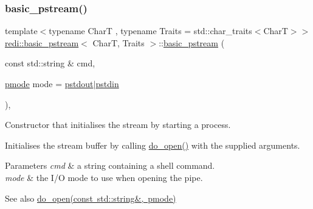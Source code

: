 \subsubsection{\texorpdfstring{basic\+\_\+pstream()}{basic\_pstream()}\hspace{0.1cm}{\footnotesize\ttfamily [1/3]}}
{\footnotesize\ttfamily template$<$typename CharT , typename Traits  = std\+::char\+\_\+traits$<$\+Char\+T$>$$>$ \\
\mbox{\hyperlink{classredi_1_1basic__pstream}{redi\+::basic\+\_\+pstream}}$<$ CharT, Traits $>$\+::\mbox{\hyperlink{classredi_1_1basic__pstream}{basic\+\_\+pstream}} (\begin{DoxyParamCaption}\item[{const std\+::string \&}]{cmd,  }\item[{\mbox{\hyperlink{structredi_1_1pstreams_a1eae4aad88812af03a0fbb3ec13c50b7}{pmode}}}]{mode = {\ttfamily \mbox{\hyperlink{structredi_1_1pstreams_ad3c6d53a98de4566478b1c40c101a42b}{pstdout}}$\vert$\mbox{\hyperlink{structredi_1_1pstreams_a7a976ce992db857f86a0cc3352e42d3a}{pstdin}}} }\end{DoxyParamCaption})\hspace{0.3cm}{\ttfamily [inline]}, {\ttfamily [explicit]}}



Constructor that initialises the stream by starting a process. 

Initialises the stream buffer by calling \mbox{\hyperlink{classredi_1_1pstream__common_a2505ab3e3a834b92d98b5bcb97734dfe}{do\+\_\+open()}} with the supplied arguments.


\begin{DoxyParams}{Parameters}
{\em cmd} & a string containing a shell command. \\
\hline
{\em mode} & the I/O mode to use when opening the pipe. \\
\hline
\end{DoxyParams}
\begin{DoxySeeAlso}{See also}
\mbox{\hyperlink{classredi_1_1pstream__common_a2505ab3e3a834b92d98b5bcb97734dfe}{do\+\_\+open(const std\+::string\&, pmode)}} 
\end{DoxySeeAlso}
\mbox{\label{classredi_1_1basic__pstream_a704808ffa353801653909d8de10a84ab}} 
